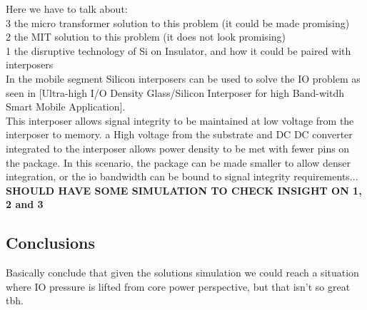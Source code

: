 \documentclass[letterpaper,twocolumn,10pt]{article}
\begin{document}
Here we have to talk about:\\
3 the micro transformer solution to this problem (it could be made promising) \\
2 the MIT solution to this problem (it does not look promising)\\
1 the disruptive technology of Si on Insulator, and how it could be paired with interposers\\
In the mobile segment Silicon interposers can be used to solve the IO problem as seen in [Ultra-high I/O Density Glass/Silicon Interposer for high Band-witdh Smart Mobile Application].\\
This interposer allows signal integrity to be maintained at low voltage from the interposer to memory. a High voltage from the substrate and DC DC converter integrated to the interposer allows power density to be met with fewer pins on the package. In this scenario, the package can be made smaller to allow denser integration, or the io bandwidth  can be bound to signal integrity requirements...\\


\textbf{SHOULD HAVE SOME SIMULATION TO CHECK INSIGHT ON 1, 2 and 3}\\

\subsection{Conclusions}

Basically conclude that given the solutions simulation we could reach a situation where IO pressure is lifted from core power perspective, but that isn't so great tbh. 
  


{\footnotesize 
}


\theendnotes
\end{document}
